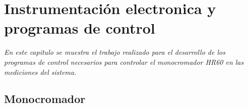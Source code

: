 \chapter{Instrumentación electronica y programas de control}
\label{chap:instrumentation}
\textit{En este capitulo se muestra el trabajo realizado para el desarrollo de los programas de control necesarios
para controlar el monocromador HR60 en las mediciones del sistema.}
\vfill
\minitoc
\newpage

\section{Monocromador}
\label{ch2:monochromator}
